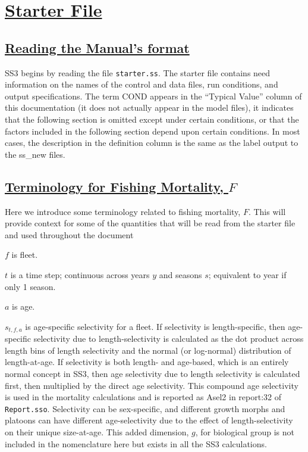 \hypertarget{StarterFile}{}
\section[Starter File]{\protect\hyperlink{StarterFile}{Starter File}}

\hypertarget{ManualFormat}{}
\subsection[Reading the Manual's format]{\protect\hyperlink{ManualFormat}{Reading the Manual's format}}
SS3 begins by reading the file \texttt{starter.ss}. The starter file contains need information on the names of the control and data files, run conditions, and output specifications. The term COND appears in the ``Typical Value'' column of this documentation (it does not actually appear in the model files), it indicates that the following section is omitted except under certain conditions, or that the factors included in the following section depend upon certain conditions. In most cases, the description in the definition column is the same as the label output to the ss\_new files.

\hypertarget{FTerminology}{}
\subsection[Terminology for Fishing Mortality, $F$]{\protect\hyperlink{FTerminology}{Terminology for Fishing Mortality, $F$}}
Here we introduce some terminology related to fishing mortality, $F$. This will provide context for some of the quantities that will be read from the starter file and used throughout the document

$f$ is fleet.

$t$ is a time step; continuous across years $y$ and seasons $s$; equivalent to year if only 1 season.

$a$ is age.

$s_{t,f,a}$ is age-specific selectivity for a fleet. If selectivity is length-specific, then age-specific selectivity due to length-selectivity is calculated as the dot product across length bins of length selectivity and the normal (or log-normal) distribution of length-at-age. If selectivity is both length- and age-based, which is an entirely normal concept in SS3, then age selectivity due to length selectivity is calculated first, then multiplied by the direct age selectivity. This compound age selectivity is used in the mortality calculations and is reported as Asel2 in report:32 of \texttt{Report.sso}. Selectivity can be sex-specific, and different growth morphs and platoons can have different age-selectivity due to the effect of length-selectivity on their unique size-at-age. This added dimension, $g$, for biological group is not included in the nomenclature here but exists in all the SS3 calculations.

